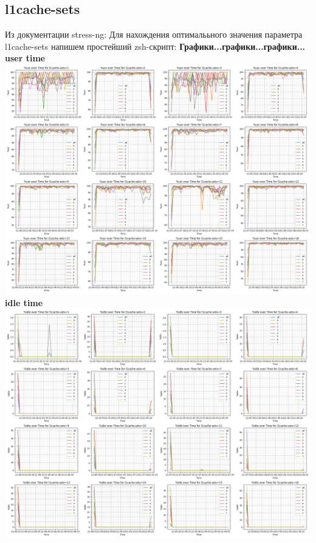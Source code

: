 \subsection{l1cache-sets}
Из документации stress-ng:
Для нахождения оптималььного значения параметра l1cache-sets напишем простейший zsh-скрипт:
\textbf{Графики...графики...графики...}\\
\textbf{user time}\\
\includegraphics[width=\textwidth]{./cache/image/l1cache-sets-usr-cpu.png}
\textbf{idle time}\\
\includegraphics[width=\textwidth]{./cache/image/l1cache-sets-idle-cpu.png}
